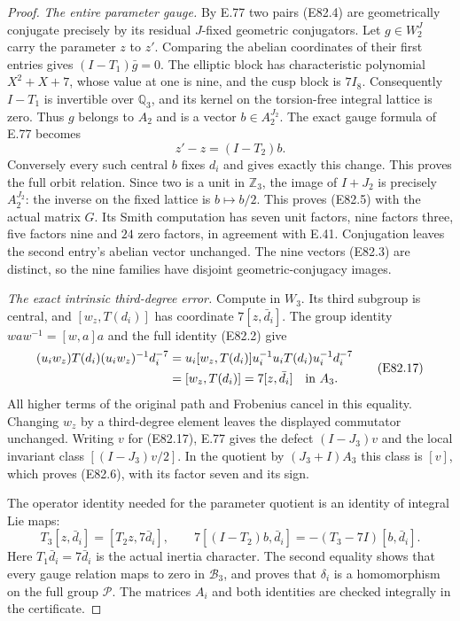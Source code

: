 \begin{proof}
\emph{The entire parameter gauge.}
By E.77 two pairs (E82.4) are geometrically conjugate
precisely by its residual $J$-fixed geometric conjugators.
Let $g\in W_2^J$ carry the parameter $z$ to $z'$.
Comparing the abelian coordinates of their first entries
gives $(I-T_1)\bar g=0$. The elliptic block has
characteristic polynomial $X^2+X+7$, whose value at one
is nine, and the cusp block is $7I_8$.
Consequently $I-T_1$ is invertible over $\mathbb Q_3$,
and its kernel on the torsion-free integral lattice is
zero. Thus $g$ belongs to $A_2$ and is a vector
$b\in A_2^{J_2}$. The exact gauge formula of E.77 becomes
\[
                  z'-z=(I-T_2)b.
 \tag{E82.16}
\]
Conversely every such central $b$ fixes $d_i$ and gives
exactly this change. This proves the full orbit relation.
Since two is a unit in $\mathbb Z_3$, the image of
$I+J_2$ is precisely $A_2^{J_2}$: the inverse on the
fixed lattice is $b\mapsto b/2$. This proves (E82.5)
with the actual matrix $G$. Its Smith computation has
seven unit factors, nine factors three, five factors
nine and $24$ zero factors, in agreement with E.41.
Conjugation leaves the second entry's abelian vector
unchanged. The nine vectors (E82.3) are distinct, so
the nine families have disjoint geometric-conjugacy images.

\emph{The exact intrinsic third-degree error.}
Compute in $W_3$. Its third subgroup is central, and
$[w_z,T(d_i)]$ has coordinate $7[z,\bar d_i]$.
The group identity $waw^{-1}=[w,a]a$ and the full
identity (E82.2) give
\[
 \begin{aligned}
 (u_iw_z)T(d_i)(u_iw_z)^{-1}d_i^{-7}
   &=u_i[w_z,T(d_i)]u_i^{-1}
      u_iT(d_i)u_i^{-1}d_i^{-7}\\
   &=[w_z,T(d_i)]=7[z,\bar d_i]\quad\hbox{in }A_3.
 \end{aligned}
 \tag{E82.17}
\]
All higher terms of the original path and Frobenius
cancel in this equality. Changing $w_z$ by a third-degree
element leaves the displayed commutator unchanged.
Writing $v$ for (E82.17), E.77 gives the defect
$(I-J_3)v$ and the local invariant class $[(I-J_3)v/2]$.
In the quotient by $(J_3+I)A_3$ this class is $[v]$,
which proves (E82.6), with its factor seven and its sign.

The operator identity needed for the parameter quotient
is an identity of integral Lie maps:
\[
       T_3[z,\bar d_i]=[T_2z,7\bar d_i],\qquad
 7[(I-T_2)b,\bar d_i]=-(T_3-7I)[b,\bar d_i].
 \tag{E82.18}
\]
Here $T_1\bar d_i=7\bar d_i$ is the actual inertia
character. The second equality shows that every gauge
relation maps to zero in $\mathcal B_3$, and proves
that $\delta_i$ is a homomorphism on the full group
$\mathcal P$. The matrices $A_i$ and both identities
are checked integrally in the certificate.


\end{proof}
